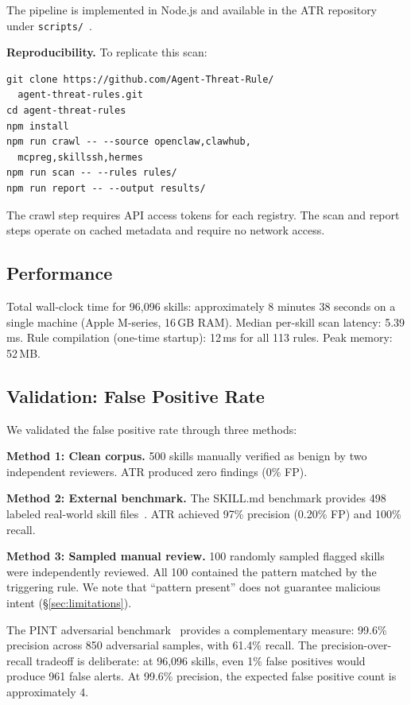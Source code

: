 \documentclass[letterpaper,twocolumn,10pt]{article}
\begin{document}
The pipeline is implemented in Node.js and available in the ATR
repository under \texttt{scripts/}~\cite{atr}.

\textbf{Reproducibility.}  To replicate this scan:

\begin{lstlisting}
git clone https://github.com/Agent-Threat-Rule/
  agent-threat-rules.git
cd agent-threat-rules
npm install
npm run crawl -- --source openclaw,clawhub,
  mcpreg,skillssh,hermes
npm run scan -- --rules rules/
npm run report -- --output results/
\end{lstlisting}

The crawl step requires API access tokens for each registry.  The scan
and report steps operate on cached metadata and require no network
access.

\subsection{Performance}

Total wall-clock time for 96,096 skills: approximately 8 minutes 38
seconds on a single machine (Apple M-series, 16\,GB RAM).  Median
per-skill scan latency: 5.39\,ms.  Rule compilation (one-time startup):
12\,ms for all 113 rules.  Peak memory: 52\,MB.

\subsection{Validation: False Positive Rate}
\label{sec:validation}

We validated the false positive rate through three methods:

\textbf{Method 1: Clean corpus.}  500 skills manually verified as benign
by two independent reviewers.  ATR produced zero findings (0\% FP).

\textbf{Method 2: External benchmark.}  The SKILL.md benchmark provides
498 labeled real-world skill files~\cite{atrskillbench}.  ATR achieved
97\% precision (0.20\% FP) and 100\% recall.

\textbf{Method 3: Sampled manual review.}  100 randomly sampled flagged
skills were independently reviewed.  All 100 contained the pattern
matched by the triggering rule.  We note that ``pattern present'' does
not guarantee malicious intent (\S\ref{sec:limitations}).

The PINT adversarial benchmark~\cite{pint} provides a complementary
measure: 99.6\% precision across 850 adversarial samples, with 61.4\%
recall.  The precision-over-recall tradeoff is deliberate: at 96,096
skills, even 1\% false positives would produce 961 false alerts.  At
99.6\% precision, the expected false positive count is approximately 4.
\end{document}
